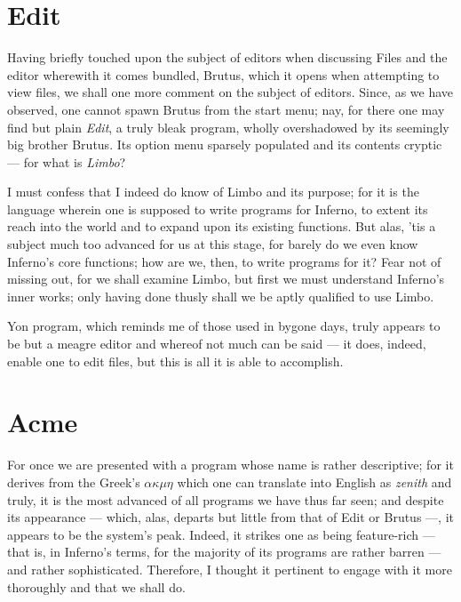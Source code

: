 \documentclass[a5paper,twoside,12pt]{report}
\begin{document}
    \section*{Edit}

    Having briefly touched upon the subject of editors when discussing Files and the editor wherewith it comes bundled, Brutus, which it opens when attempting to view files, we shall one more comment on the subject of editors. Since, as we have observed, one cannot spawn Brutus from the start menu; nay, for there one may find but plain \textit{Edit}, a truly bleak program, wholly overshadowed by its seemingly big brother Brutus. Its option menu sparsely populated and its contents cryptic — for what is \textit{Limbo}?

    I must confess that I indeed do know of Limbo and its purpose; for it is the language wherein one is supposed to write programs for Inferno, to extent its reach into the world and to expand upon its existing functions. But alas, 'tis a subject much too advanced for us at this stage, for barely do we even know Inferno's core functions; how are we, then, to write programs for it? Fear not of missing out, for we shall examine Limbo, but first we must understand Inferno's inner works; only having done thusly shall we be aptly qualified to use Limbo.

    Yon program, which reminds me of those used in bygone days, truly appears to be but a meagre editor and whereof not much can be said — it does, indeed, enable one to edit files, but this is all it is able to accomplish.

    \section*{Acme}

    For once we are presented with a program whose name is rather descriptive; for it derives from the Greek's \textit{$\alpha$$\kappa$$\mu$$\eta$} which one can translate into English as \textit{zenith} and truly, it is the most advanced of all programs we have thus far seen; and despite its appearance — which, alas, departs but little from that of Edit or Brutus —, it appears to be the system's peak. Indeed, it strikes one as being feature-rich — that is, in Inferno's terms, for the majority of its programs are rather barren — and rather sophisticated. Therefore, I thought it pertinent to engage with it more thoroughly and that we shall do.
\end{document}
